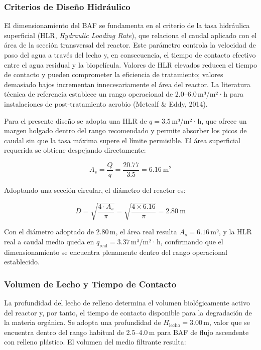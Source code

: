 \documentclass[12pt,a4paper]{article}
\begin{document}
\subsubsection*{Criterios de Diseño Hidráulico}

El dimensionamiento del BAF se fundamenta en el criterio de la tasa hidráulica superficial (HLR, \textit{Hydraulic Loading Rate}), que relaciona el caudal aplicado con el área de la sección transversal del reactor. Este parámetro controla la velocidad de paso del agua a través del lecho y, en consecuencia, el tiempo de contacto efectivo entre el agua residual y la biopelícula. Valores de HLR elevados reducen el tiempo de contacto y pueden comprometer la eficiencia de tratamiento; valores demasiado bajos incrementan innecesariamente el área del reactor. La literatura técnica de referencia establece un rango operacional de 2.0--6.0\,m³/m²·h para instalaciones de post-tratamiento aerobio (Metcalf \& Eddy, 2014).

Para el presente diseño se adopta una HLR de $q = 3.5$\,m³/m²·h, que ofrece un margen holgado dentro del rango recomendado y permite absorber los picos de caudal sin que la tasa máxima supere el límite permisible. El área superficial requerida se obtiene despejando directamente:

\begin{equation}
A_{s} = \frac{Q}{q} = \frac{20.77}{3.5} = 6.16\ \text{m}^2
\end{equation}

Adoptando una sección circular, el diámetro del reactor es:

\begin{equation}
D = \sqrt{\frac{4 \cdot A_{s}}{\pi}} = \sqrt{\frac{4 \times 6.16}{\pi}} = 2.80\ \text{m}
\end{equation}

Con el diámetro adoptado de 2.80\,m, el área real resulta $A_{s} = 6.16$\,m², y la HLR real a caudal medio queda en $q_{\text{real}} = 3.37$\,m³/m²·h, confirmando que el dimensionamiento se encuentra plenamente dentro del rango operacional establecido.

\subsubsection*{Volumen de Lecho y Tiempo de Contacto}

La profundidad del lecho de relleno determina el volumen biológicamente activo del reactor y, por tanto, el tiempo de contacto disponible para la degradación de la materia orgánica. Se adopta una profundidad de $H_{\text{lecho}} = 3.00$\,m, valor que se encuentra dentro del rango habitual de 2.5--4.0\,m para BAF de flujo ascendente con relleno plástico. El volumen del medio filtrante resulta:
\end{document}
